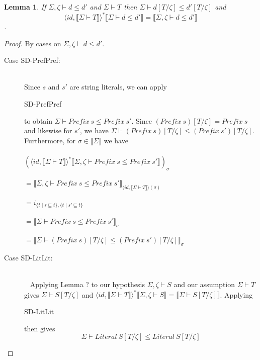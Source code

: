 \documentclass{article}
\newtheorem{lemma}{Lemma}
\newcommand{\sem}[1]{\llbracket #1 \rrbracket}
\begin{document}
\begin{lemma}
If $\Sigma,\zeta \vdash d \leq d'$ and $\Sigma \vdash T$ then $\Sigma \vdash d[T/\zeta] \leq d'[T/\zeta]$ and 
$$\langle \mathit{id}, \sem{\Sigma \vdash T} \rangle^* \sem{\Sigma \vdash d \leq d'} = \sem{\Sigma,\zeta \vdash d \leq d'}$$.
\label{SD-Subst}
\end{lemma}

\begin{proof}
By cases on $\Sigma,\zeta \vdash d \leq d'$.
\begin{description}
\item[Case SD-PrefPref:]~\\
Since $s$ and $s'$ are string literals, we can apply \begin{sc}SD-PrefPref\end{sc} to obtain $\Sigma \vdash \mathit{Prefix}~s \leq \mathit{Prefix}~s'$. Since $(\mathit{Prefix}~s)[T/\zeta] = \mathit{Prefix}~s$ and likewise for $s'$, we have $\Sigma \vdash (\mathit{Prefix}~s)[T/\zeta] \leq (\mathit{Prefix}~s')[T/\zeta]$. Furthermore, for $\sigma \in \sem{\Sigma}$ we have\\~\\ 
$(\langle \mathit{id}, \sem{\Sigma \vdash T} \rangle^* \sem{\Sigma,\zeta \vdash \mathit{Prefix}~s \leq \mathit{Prefix}~s'})_\sigma$\\~\\
$= \sem{\Sigma,\zeta \vdash \mathit{Prefix}~s \leq \mathit{Prefix}~s'}_{\langle \mathit{id}, \sem{\Sigma \vdash T} \rangle(\sigma)}$\\~\\
$= i_{\{ t \mid s \sqsubseteq t \}, \{ t \mid s' \sqsubseteq t \}}$\\~\\
$= \sem{\Sigma \vdash \mathit{Prefix}~s \leq \mathit{Prefix}~s'}_{\sigma}$\\~\\
$= \sem{\Sigma \vdash (\mathit{Prefix}~s)[T/\zeta] \leq (\mathit{Prefix}~s')[T/\zeta]}_{\sigma}$
\item[Case SD-LitLit:]~\\
~
Applying Lemma ? to our hypothesis $\Sigma,\zeta \vdash S$ and our assumption $\Sigma \vdash T$ gives
$\Sigma \vdash S[T/\zeta]$ and $\langle \mathit{id}, \sem{\Sigma \vdash T} \rangle^* \sem{\Sigma,\zeta \vdash S} = \sem{\Sigma \vdash S[T/\zeta]}$. Applying \begin{sc}SD-LitLit\end{sc} then gives $$\Sigma \vdash \mathit{Literal}~S[T/\zeta] \leq \mathit{Literal}~S[T/\zeta]$$


\end{description}
\end{proof}
\end{document}
